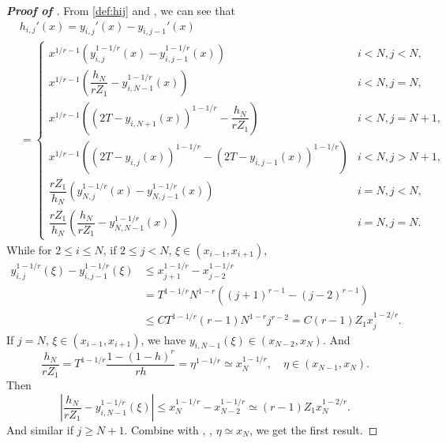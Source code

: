 \documentclass{amsart}
\theoremstyle{definition}
\theoremstyle{remark}
\numberwithin{equation}{section}
\begin{document}
\begin{proof} [\bf Proof of ]
  From \eqref{def:hij} and , we can see that
  \begin{equation*}
    \begin{aligned}
      & h_{i,j}'(x) = y_{i,j}'(x) - y_{i,j-1}'(x) \\ 
      &=\begin{cases}
        x^{1/r-1} ( y_{i,j}^{1-1/r}(x) - y_{i,j-1}^{1-1/r}(x) ) & i< N, j< N, \\
        x^{1/r-1} ( \dfrac{h_N}{r Z_1} - y_{i,N-1}^{1-1/r}(x) )  & i< N, j=N, \\
        x^{1/r-1} \left( (2T-y_{i,N+1}(x))^{1-1/r} - \dfrac{h_N}{r Z_1}  \right)   & i< N, j=N+1, \\
        x^{1/r-1} \left( (2T-y_{i,j}(x))^{1-1/r} - (2T-y_{i,j-1}(x))^{1-1/r} \right)   & i< N, j>N+1, \\
        \dfrac{rZ_1}{h_N} \left( y_{N,j}^{1-1/r}(x) - y_{N,j-1}^{1-1/r}(x) \right)  & i=N, j< N ,\\
        \dfrac{rZ_1}{h_N} \left( \dfrac{h_N}{rZ_1} - y_{N,N-1}^{1-1/r}(x) \right)   & i=N, j=N .
      \end{cases}
    \end{aligned}
  \end{equation*}
  While for \(2\le i\le N\), if \(2\le j < N\), \(\xi \in (x_{i-1}, x_{i+1})\),
  \begin{equation} \label{eq:yij1-1/r-j-1}
    \begin{aligned}
      y_{i,j}^{1-1/r}(\xi) - y_{i,j-1}^{1-1/r}(\xi)
      &\le x_{j+1}^{1-1/r} - x_{j-2}^{1-1/r}  \\
      &= T^{1-1/r} N^{1-r} \left( (j+1)^{r-1} - (j-2)^{r-1} \right) \\
      & \le C T^{1-1/r} (r-1) N^{1-r} j^{r-2} = C  (r-1) Z_1 x_j^{1-2/r}.
    \end{aligned}
  \end{equation}
  If \(j=N\), \(\xi \in (x_{i-1}, x_{i+1})\), we have \(y_{i,N-1}(\xi) \in (x_{N-2}, x_{N})\). And 
  \begin{equation} \label{eq:hN/rZ1}
    \dfrac{h_N}{r Z_1} = T^{1-1/r} \dfrac{1 - (1-h)^r}{rh} = \eta^{1-1/r} \simeq x_N^{1-1/r}, \quad \eta \in (x_{N-1}, x_{N}).
  \end{equation}
  Then
  \begin{equation*} \label{eq:hN/rZ1-yj=N-1}
    |\dfrac{h_N}{r Z_1} - y_{i,N-1}^{1-1/r}(\xi)| \le x_N^{1-1/r} - x_{N-2}^{1-1/r} \simeq (r-1) Z_1 x_N^{1-2/r}.
  \end{equation*}
  And similar if \(j\ge N+1\).
  Combine with , , \(\eta \simeq x_N\), we get the first result.


\end{proof}
\end{document}
